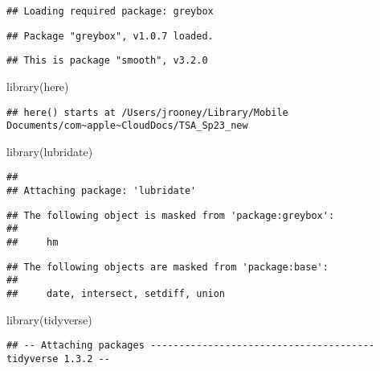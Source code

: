 \documentclass[
]{article}
\newenvironment{Shaded}{\begin{snugshade}}{\end{snugshade}}
\newcommand{\FunctionTok}[1]{\textcolor[rgb]{0.00,0.00,0.00}{#1}}
\newcommand{\NormalTok}[1]{#1}
\begin{document}
\begin{verbatim}
## Loading required package: greybox
\end{verbatim}

\begin{verbatim}
## Package "greybox", v1.0.7 loaded.
\end{verbatim}

\begin{verbatim}
## This is package "smooth", v3.2.0
\end{verbatim}

\begin{Shaded}
\begin{Highlighting}[]
\FunctionTok{library}\NormalTok{(here)}
\end{Highlighting}
\end{Shaded}

\begin{verbatim}
## here() starts at /Users/jrooney/Library/Mobile Documents/com~apple~CloudDocs/TSA_Sp23_new
\end{verbatim}

\begin{Shaded}
\begin{Highlighting}[]
\FunctionTok{library}\NormalTok{(lubridate)}
\end{Highlighting}
\end{Shaded}

\begin{verbatim}
## 
## Attaching package: 'lubridate'
\end{verbatim}

\begin{verbatim}
## The following object is masked from 'package:greybox':
## 
##     hm
\end{verbatim}

\begin{verbatim}
## The following objects are masked from 'package:base':
## 
##     date, intersect, setdiff, union
\end{verbatim}

\begin{Shaded}
\begin{Highlighting}[]
\FunctionTok{library}\NormalTok{(tidyverse)}
\end{Highlighting}
\end{Shaded}

\begin{verbatim}
## -- Attaching packages --------------------------------------- tidyverse 1.3.2 --
\end{verbatim}
\end{document}

